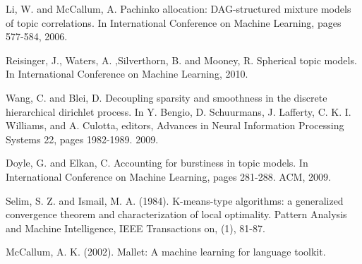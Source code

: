 \documentclass[conference]{IEEEtran}
\begin{document}
\begin{thebibliography}{1}
Li, W. and McCallum, A. Pachinko allocation: DAG-structured mixture models of topic correlations. In International Conference on Machine Learning, pages 577-584, 2006.

Reisinger, J., Waters, A. ,Silverthorn, B. and Mooney, R. Spherical topic models. In International Conference on Machine Learning, 2010.

Wang, C. and Blei, D. Decoupling sparsity and smoothness in the discrete hierarchical dirichlet process. In Y. Bengio, D. Schuurmans, J. Lafferty, C. K. I. Williams, and A. Culotta, editors, Advances in Neural Information Processing Systems 22, pages 1982-1989. 2009.

Doyle, G. and Elkan, C. Accounting for burstiness in topic models. In International Conference on Machine Learning, pages 281-288. ACM, 2009.

Selim, S. Z. and Ismail, M. A. (1984). K-means-type algorithms: a generalized convergence theorem and characterization of local optimality. Pattern Analysis and Machine Intelligence, IEEE Transactions on, (1), 81-87.


McCallum, A. K. (2002). Mallet: A machine learning for language toolkit.

\end{thebibliography}




\end{document}
